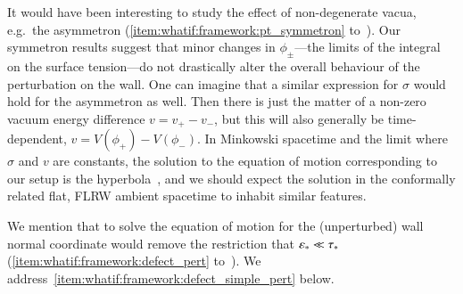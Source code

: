 It would have been interesting to study the effect of non-degenerate vacua, e.g.~the asymmetron 
(\cref{item:whatif:framework:pt_symmetron} to~). Our symmetron results suggest that minor changes in $\phi_\pm$---the limits of the integral on the surface tension---do not drastically alter the overall behaviour of the perturbation on the wall. One can imagine that a similar expression for $\sigma$ would hold for the asymmetron as well. Then there is just the matter of a non-zero vacuum energy difference $v=v_+-v_-$, but this will also generally be time-dependent, $v=V(\phi_+)-V(\phi_-)$. In Minkowski spacetime and the limit where $\sigma$ and $v$ are constants, the solution to the equation of motion corresponding to our setup is the hyperbola~\citep{garrigaPerturbationsDomainWalls1991}, and we should expect the solution in the conformally related flat, FLRW ambient spacetime to inhabit similar features. 

We mention that to solve the equation of motion for the (unperturbed) wall normal coordinate would remove the restriction that $\varepsilon_\ast\ll \tau_\ast$ (\cref{item:whatif:framework:defect_pert} to~). We address~\cref{item:whatif:framework:defect_simple_pert} below.





